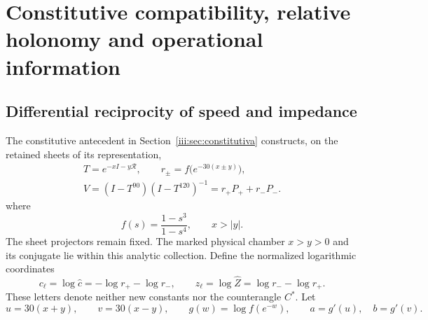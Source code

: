 \section{Constitutive compatibility, relative holonomy and operational information}
\label{md:comp:capitulo}

\subsection{Differential reciprocity of speed and impedance}
\label{md:comp:reciprocidad}

The constitutive antecedent in Section~\ref{iii:sec:constitutiva}
constructs, on the retained sheets of its representation,
\begin{equation}
 \begin{gathered}
 T=e^{-xI-y\mathcal R},\qquad
 r_\pm=f\bigl(e^{-30(x\pm y)}\bigr),\\
 V=(I-T^{90})(I-T^{120})^{-1}=r_+P_++r_-P_-.
 \end{gathered}
 \label{md:comp:constitutiva}
\end{equation}
where
\[
 f(s)=\frac{1-s^3}{1-s^4},\qquad x>|y|.
\]
The sheet projectors remain fixed. The marked physical chamber
\(x>y>0\) and its conjugate lie within this analytic collection.
Define the normalized logarithmic coordinates
\begin{equation}
 c_\ell=\log\widehat c=-\log r_+-\log r_-,\qquad
 z_\ell=\log\widehat Z=\log r_--\log r_+.
 \label{md:comp:logaritmos}
\end{equation}
These letters denote neither new constants nor the counterangle \(C^*\).
Let
\[
 u=30(x+y),\qquad v=30(x-y),\qquad
 g(w)=\log f(e^{-w}),\qquad a=g'(u),\quad b=g'(v).
\]

